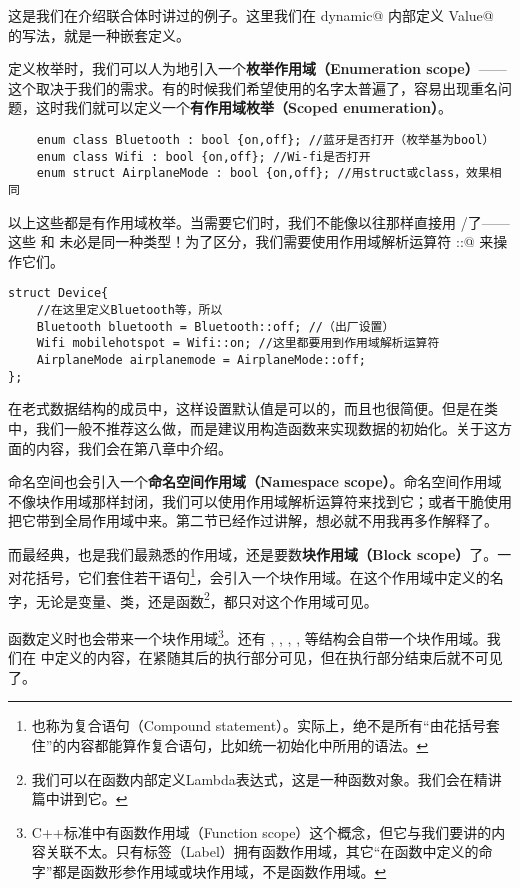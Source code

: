 这是我们在介绍联合体时讲过的例子。这里我们在 \lstinline@struct dynamic@ 内部定义 \lstinline@union Value@ 的写法，就是一种嵌套定义。\par
定义枚举时，我们可以人为地引入一个\textbf{枚举作用域（Enumeration scope）}——这个取决于我们的需求。有的时候我们希望使用的名字太普遍了，容易出现重名问题，这时我们就可以定义一个\textbf{有作用域枚举（Scoped enumeration）}。
\begin{lstlisting}
    enum class Bluetooth : bool {on,off}; //蓝牙是否打开（枚举基为bool）
    enum class Wifi : bool {on,off}; //Wi-fi是否打开
    enum struct AirplaneMode : bool {on,off}; //用struct或class，效果相同
\end{lstlisting}
以上这些都是有作用域枚举。当需要它们时，我们不能像以往那样直接用 \lstinline@on@/\lstinline@off@ 了——这些 \lstinline@on@ 和 \lstinline@off@ 未必是同一种类型！为了区分，我们需要使用作用域解析运算符 \lstinline@::@ 来操作它们。
\begin{lstlisting}
struct Device{
    //在这里定义Bluetooth等，所以
    Bluetooth bluetooth = Bluetooth::off; //（出厂设置）
    Wifi mobilehotspot = Wifi::on; //这里都要用到作用域解析运算符
    AirplaneMode airplanemode = AirplaneMode::off;
};
\end{lstlisting}
在老式数据结构的成员中，这样设置默认值是可以的，而且也很简便。但是在类中，我们一般不推荐这么做，而是建议用构造函数来实现数据的初始化。关于这方面的内容，我们会在第八章中介绍。\par
命名空间也会引入一个\textbf{命名空间作用域（Namespace scope）}。命名空间作用域不像块作用域那样封闭，我们可以使用作用域解析运算符来找到它；或者干脆使用 \lstinline@using@ 把它带到全局作用域中来。第二节已经作过讲解，想必就不用我再多作解释了。\par
而最经典，也是我们最熟悉的作用域，还是要数\textbf{块作用域（Block scope）}了。一对花括号，它们套住若干语句\footnote{也称为复合语句（Compound statement）。实际上，绝不是所有``由花括号套住''的内容都能算作复合语句，比如统一初始化中所用的语法。}，会引入一个块作用域。在这个作用域中定义的名字，无论是变量、类，还是函数\footnote{我们可以在函数内部定义Lambda表达式，这是一种函数对象。我们会在精讲篇中讲到它。}，都只对这个作用域可见。\par
函数定义时也会带来一个块作用域\footnote{C++标准中有函数作用域（Function scope）这个概念，但它与我们要讲的内容关联不太。只有标签（Label）拥有函数作用域，其它``在函数中定义的命字''都是函数形参作用域或块作用域，不是函数作用域。}。还有 \lstinline@for@, \lstinline@while@, \lstinline@if@, \lstinline@else@, \lstinline@switch@ 等结构会自带一个块作用域。我们在 \lstinline@for@ 中定义的内容，在紧随其后的执行部分可见，但在执行部分结束后就不可见了。\par
